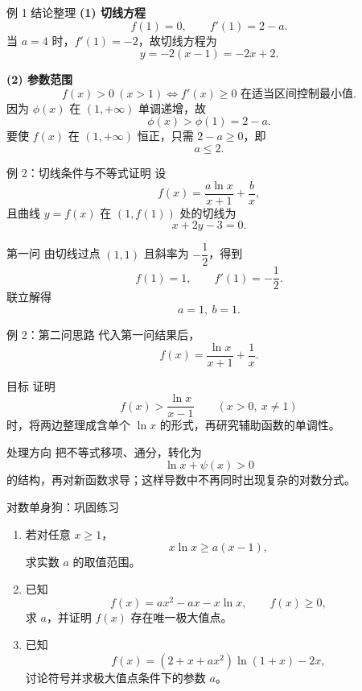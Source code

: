 ﻿\documentclass[aspectratio=169,11pt]{ctexbeamer}
\begin{document}
\begin{frame}{例 1 结论整理}
\small
\textbf{(1) 切线方程}
\[
f(1)=0,\qquad f'(1)=2-a.
\]
当 $a=4$ 时，$f'(1)=-2$，故切线方程为
\[
y=-2(x-1)= -2x+2.
\]

\vspace{0.5em}
\textbf{(2) 参数范围}
\[
f(x)>0 \ (x>1)\Longleftrightarrow f'(x)\ge 0 \text{ 在适当区间控制最小值}.
\]
因为 $\phi(x)$ 在 $(1,+\infty)$ 单调递增，故
\[
\phi(x)>\phi(1)=2-a.
\]
要使 $f(x)$ 在 $(1,+\infty)$ 恒正，只需 $2-a\ge 0$，即
\[
\boxed{a\le 2}.
\]
\end{frame}

\begin{frame}{例 2：切线条件与不等式证明}
\small
设
\[
f(x)=\frac{a\ln x}{x+1}+\frac{b}{x},
\]
且曲线 $y=f(x)$ 在 $(1,f(1))$ 处的切线为
\[
x+2y-3=0.
\]

\begin{block}{第一问}
由切线过点 $(1,1)$ 且斜率为 $-\dfrac12$，得到
\[
f(1)=1,\qquad f'(1)=-\frac12.
\]
联立解得
\[
\boxed{a=1,\ b=1}.
\]
\end{block}
\end{frame}

\begin{frame}{例 2：第二问思路}
\small
代入第一问结果后，
\[
f(x)=\frac{\ln x}{x+1}+\frac1x.
\]

\begin{alertblock}{目标}
证明
\[
f(x)>\frac{\ln x}{x-1}\qquad (x>0,\ x\ne 1)
\]
时，将两边整理成含单个 $\ln x$ 的形式，再研究辅助函数的单调性。
\end{alertblock}
\begin{block}{处理方向}
把不等式移项、通分，转化为
\[
\ln x+\psi(x)>0
\]
的结构，再对新函数求导；这样导数中不再同时出现复杂的对数分式。
\end{block}
\end{frame}

\begin{frame}{对数单身狗：巩固练习}
\small
\begin{enumerate}
  \item 若对任意 $x\ge 1$，
  \[
  x\ln x\ge a(x-1),
  \]
  求实数 $a$ 的取值范围。
  \item 已知
  \[
  f(x)=ax^2-ax-x\ln x,\qquad f(x)\ge 0,
  \]
  求 $a$，并证明 $f(x)$ 存在唯一极大值点。
  \item 已知
  \[
  f(x)=(2+x+ax^2)\ln(1+x)-2x,
  \]
  讨论符号并求极大值点条件下的参数 $a$。
\end{enumerate}
\end{frame}
\end{document}
